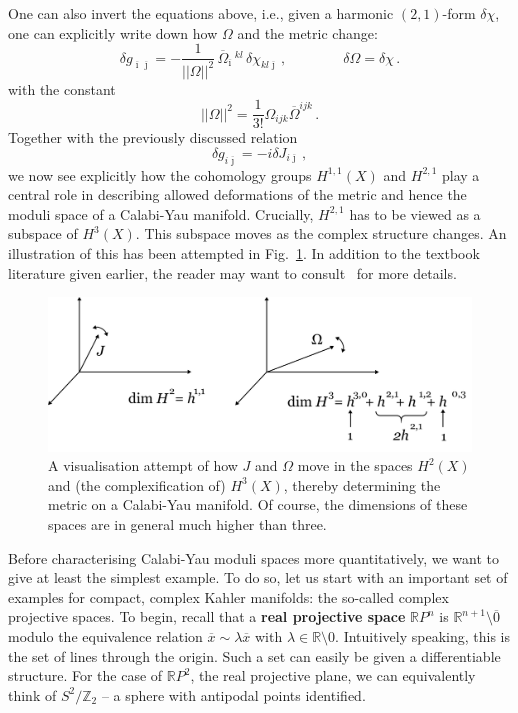 \documentclass[12pt]{article}
\newcommand{\be}{\begin{equation}}
\newcommand{\ee}{\end{equation}}
\newcommand{\ol}{\overline}
\numberwithin{equation}{section}
\begin{document}
One can also invert the equations above, i.e., given a harmonic $(2,1)$-form $\delta\chi$, one can explicitly write down how $\Omega$ and the metric change:
\be
\delta g_{\ol{\imath}\ol{\jmath}}=-\frac{1}{||\Omega||^2}\, \ol{\Omega}_{\ol{\imath}}\,{}^{kl}\,\delta\chi_{kl\ol{\jmath}}\,,\qquad\qquad
\delta\Omega=\delta \chi\,.
\ee
with the constant
\be
||\Omega||^2=\frac{1}{3!}\Omega_{ijk}\ol{\Omega}^{ijk}\,.
\ee
Together with the previously discussed relation 
\be
\delta g_{i\ol{\jmath}}=-i\delta J_{i\ol{\jmath}}\,,
\ee
we now see explicitly how the cohomology groups $H^{1,1}(X)$ and $H^{2,1}$ play a central role in describing allowed deformations of the metric and hence the moduli space of a Calabi-Yau manifold. Crucially, $H^{2,1}$ has to be viewed as a subspace of $H^3(X)$. This subspace moves as the complex structure changes. An illustration of this has been attempted in Fig.~\ref{cym}. In addition to the textbook literature given earlier, the reader may want to consult~\cite{Candelas:1990pi,Font:2005td} for more details.

\begin{figure}[ht]
\begin{center} 
\includegraphics[width=13cm]{cym.png}
\caption{A visualisation attempt of how $J$ and $\Omega$ move in the spaces $H^2(X)$ and (the complexification of) $H^3(X)$, thereby determining the metric on a Calabi-Yau manifold. Of course, the dimensions of these spaces are in general much higher than three.}
\label{cym} 
\end{center}
\end{figure}

Before characterising Calabi-Yau moduli spaces more quantitatively, we want to give at least the simplest example. To do so, let us start with an important set of examples for compact, complex Kahler manifolds: the so-called complex projective spaces. To begin, recall that a {\bf real projective space} $\mathbb{R}P^n$ is $\mathbb{R}^{n+1} \!\setminus\! \ol{0}$ modulo the equivalence relation $\ol{x}\sim \lambda \ol{x}$ with $\lambda\in \mathbb{R}\setminus 0$. Intuitively speaking, this is the set of lines through the origin. Such a set can easily be given a differentiable structure. For the case of $\mathbb{R}P^2$, the real projective plane, we can equivalently think of $S^2/\mathbb{Z}_2$ -- a sphere with antipodal points identified. 
\end{document}

